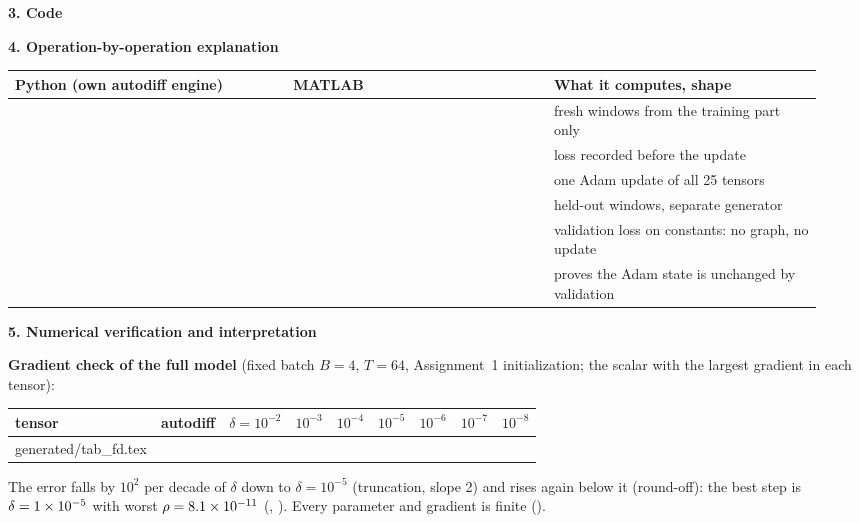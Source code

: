 \documentclass[11pt,a4paper]{article}
\makeatletter
\newcommand{\tabinput}[1]{\@@input #1 }
\numberwithin{equation}{section}
\DeclareRobustCommand{\code}[1]{\texttt{\detokenize{#1}}}
\newenvironment{ops}{\par\small\renewcommand{\arraystretch}{1.18}%
  \begin{longtable}{@{}>{\raggedright\arraybackslash}p{0.325\linewidth}>{\raggedright\arraybackslash}p{0.30\linewidth}>{\raggedright\arraybackslash}p{0.315\linewidth}@{}}
  \toprule \textbf{Python (own autodiff engine)} & \textbf{MATLAB} & \textbf{What it computes, shape}\\ \midrule\endhead}
  {\bottomrule\end{longtable}\vspace{-0.6em}}
\newcommand{\stephead}[1]{\par\smallskip\noindent\textbf{\small #1}\par\nobreak}
\makeatother
\begin{document}
\stephead{3. Code}





\stephead{4. Operation-by-operation explanation}
\begin{ops}
\code{get_batch(train_ids, B, T, rng_train)} & \code{sample_batch(train, B, T, streams.train)} & fresh windows from the training part only\\
\code{train_curve[s - 1] = float(L_t.data)} & \code{train_curve(s) = Ls;} & loss recorded before the update\\
\code{opt.step(arrays, g)} & \code{adam_step(F, G, state, ...)} & one Adam update of all 25 tensors\\
\code{get_batch(val_ids, B_val, T, rng_val)} & \code{sample_batch(val, B_val, T, streams.val)} & 8 held-out windows, separate generator\\
\code{evaluate(P, Xv, Yv, L)} & \code{cross_entropy(} \code{gpt_forward(...),} \code{Yv(:))} & validation loss on constants: no graph, no update\\
\code{opt.fingerprint() == before} & \code{isequal(before,} \code{adam_fingerprint(state))} & proves the Adam state is unchanged by validation\\
\end{ops}

\stephead{5. Numerical verification and interpretation}
\textbf{Gradient check of the full model} (fixed batch $B=4$, $T=64$, Assignment~1 initialization; the scalar with the
largest gradient in each tensor):
\begin{center}
\small
\setlength{\tabcolsep}{4pt}
\begin{tabular}{@{}lcccccccc@{}}
\toprule
tensor & autodiff & $\delta=10^{-2}$ & $10^{-3}$ & $10^{-4}$ & $10^{-5}$ & $10^{-6}$ & $10^{-7}$ & $10^{-8}$\\ \midrule
\tabinput{generated/tab_fd.tex}
\bottomrule
\end{tabular}
\label{tab:fd}
\end{center}
The error falls by $10^2$ per decade of $\delta$ down to $\delta=10^{-5}$ (truncation, slope 2) and rises again below it
(round-off): the best step is $\delta=1\times10^{-5}$ with worst $\rho=8.1\times10^{-11}$ (\code{Q4.2}, \code{Q4.3}). Every parameter and
gradient is finite (\code{Q4.4}).
\end{document}
